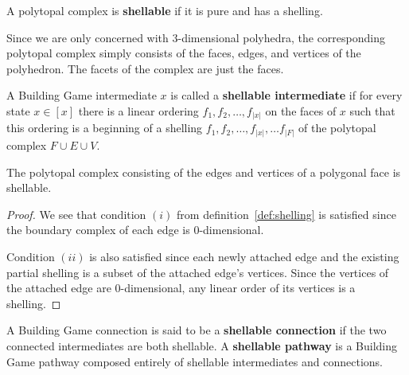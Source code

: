 \begin{mydef}
A polytopal complex is \textbf{shellable} if it is pure and has a shelling. 
\end{mydef}

Since we are only concerned with $3$-dimensional polyhedra, the corresponding polytopal complex simply consists of the faces, edges, and vertices of the polyhedron. The facets of the complex are just the faces.



\begin{mydef}
A Building Game intermediate $x$ is called a \textbf{shellable intermediate} if for every state $x \in [x]$ there is a linear ordering $f_1, f_2, \dots, f_{|x|}$ on the faces of $x$ such that this ordering is a beginning of a shelling $f_1, f_2, \dots, f_{|x|}, \dots f_{|F|}$ of the polytopal complex $F\cup E\cup V$.
\end{mydef}

\begin{mylem}
The polytopal complex consisting of the edges and vertices of a polygonal face is shellable.
\end{mylem}
\begin{proof}
We see that condition $(i)$ from definition~\ref{def:shelling} is satisfied since the boundary complex of each edge is $0$-dimensional.

Condition $(ii)$ is also satisfied since each newly attached edge and the existing partial shelling is a subset of the attached edge's vertices. Since the vertices of the attached edge are $0$-dimensional, any linear order of its vertices is a shelling.
\end{proof}



\begin{mydef}
A Building Game connection is said to be a \textbf{shellable connection} if the two connected intermediates are both shellable. A \textbf{shellable pathway} is a Building Game pathway composed entirely of shellable intermediates and connections.
\end{mydef}

